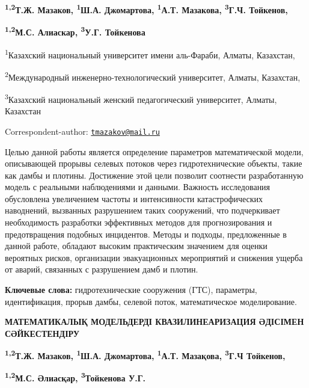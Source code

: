 
\begin{articleheader}

{\bfseries \textsuperscript{1,2}Т.Ж. Мазаков\textsuperscript{\envelope },
\textsuperscript{1}Ш.А. Джомартова, \textsuperscript{1}А.Т. Мазакова,
\textsuperscript{3}Г.Ч. Тойкенов,}

{\bfseries \textsuperscript{1,2}М.С. Алиаскар, \textsuperscript{3}У.Г.
Тойкенова}
\end{articleheader}

\begin{affiliation}
\textsuperscript{1}Казахский национальный университет имени аль-Фараби,
Алматы, Казахстан,

\textsuperscript{2}Международный инженерно-технологический университет,
Алматы, Казахстан,

\textsuperscript{3}Казахский национальный женский педагогический
университет, Алматы, Казахстан

\raggedright {\bfseries \textsuperscript{\envelope }}Correspondent-author: \href{mailto:tmazakov@mail.ru}{\nolinkurl{tmazakov@mail.ru}}
\end{affiliation}

Целью данной работы является определение параметров математической
модели, описывающей прорывы селевых потоков через гидротехнические
объекты, такие как дамбы и плотины. Достижение этой цели позволит
соотнести разработанную модель с реальными наблюдениями и данными.
Важность исследования обусловлена увеличением частоты и интенсивности
катастрофических наводнений, вызванных разрушением таких сооружений, что
подчеркивает необходимость разработки эффективных методов для
прогнозирования и предотвращения подобных инцидентов. Методы и подходы,
предложенные в данной работе, обладают высоким практическим значением
для оценки вероятных рисков, организации эвакуационных мероприятий и
снижения ущерба от аварий, связанных с разрушением дамб и плотин.

{\bfseries Ключевые слова:} гидротехнические сооружения (ГТС), параметры,
идентификация, прорыв дамбы, селевой поток, математическое
моделирование.

\begin{articleheader}
{\bfseries МАТЕМАТИКАЛЫҚ МОДЕЛЬДЕРДІ КВАЗИЛИНЕАРИЗАЦИЯ ӘДІСІМЕН
СӘЙКЕСТЕНДІРУ}

{\bfseries \textsuperscript{1,2}Т.Ж. Мазаков\textsuperscript{\envelope },
\textsuperscript{1}Ш.А. Джомартова, \textsuperscript{1}А.Т. Мазақова,
\textsuperscript{3}Г.Ч Тойкенов,}

{\bfseries \textsuperscript{1,2}М.С. Әлиасқар, \textsuperscript{3}Тойкенова
У.Г.}
\end{articleheader}

